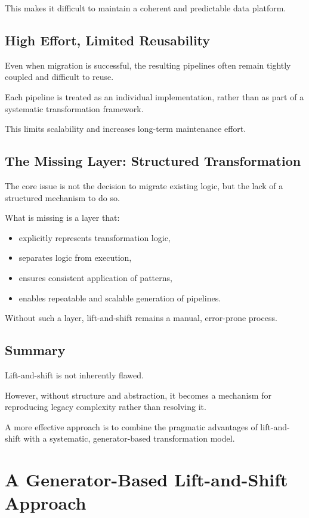 \documentclass[11pt,a4paper]{article}
\begin{document}
This makes it difficult to maintain a coherent and predictable data platform.

\subsection{High Effort, Limited Reusability}

Even when migration is successful, the resulting pipelines often remain tightly coupled and difficult to reuse.

Each pipeline is treated as an individual implementation, rather than as part of a systematic transformation framework.

This limits scalability and increases long-term maintenance effort.

\subsection{The Missing Layer: Structured Transformation}

The core issue is not the decision to migrate existing logic, but the lack of a structured mechanism to do so.

What is missing is a layer that:
\begin{itemize}
  \item explicitly represents transformation logic,
  \item separates logic from execution,
  \item ensures consistent application of patterns,
  \item enables repeatable and scalable generation of pipelines.
\end{itemize}

Without such a layer, lift-and-shift remains a manual, error-prone process.

\subsection{Summary}

Lift-and-shift is not inherently flawed.

However, without structure and abstraction, it becomes a mechanism for reproducing legacy complexity rather than resolving it.

A more effective approach is to combine the pragmatic advantages of lift-and-shift with a systematic, generator-based transformation model.

\section{A Generator-Based Lift-and-Shift Approach}
\end{document}
